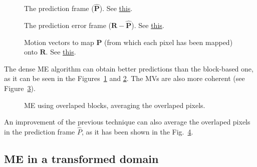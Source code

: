 \begin{figure}
  \centering
  \caption{The prediction frame (${\hat{\mathbf P}}$). See \href{https://github.com/Sistemas-Multimedia/Sistemas-Multimedia.github.io/blob/master/milestones/09-ME/full_search_dense_ME.ipynb}{this}.}
  \label{fig:hat_P_dense}
\end{figure}

\begin{figure}
  \centering
  \caption{The prediction error frame (${\mathbf R} - {\hat{\mathbf P}}$). See \href{https://github.com/Sistemas-Multimedia/Sistemas-Multimedia.github.io/blob/master/milestones/09-ME/full_search_dense_ME.ipynb}{this}.}
  \label{fig:error_dense}
\end{figure}

\begin{figure}
  \centering
  \caption{Motion vectors to map ${\mathbf P}$ (from which each pixel has been mapped) onto ${\mathbf R}$. See \href{https://github.com/Sistemas-Multimedia/Sistemas-Multimedia.github.io/blob/master/milestones/09-ME/full_search_dense_ME.ipynb}{this}.}
  \label{fig:MVs_dense}
\end{figure}

The dense ME algorithm can obtain better predictions than the
block-based one, as it can be seen in the
Figures~\ref{fig:hat_P_dense} and \ref{fig:error_dense}. The MVs are
also more coherent (see Figure~\ref{fig:MVs_dense}).

\begin{figure}
  \centering
  \caption{ME using overlaped blocks, averaging the overlaped pixels.}
  \label{fig:average}
\end{figure}

An improvement of the previous technique can also average the
overlaped pixels in the prediction frame $\hat{P}$, as it has been
shown in the Fig.~\ref{fig:average}.

\subsection{ME in a transformed domain}

